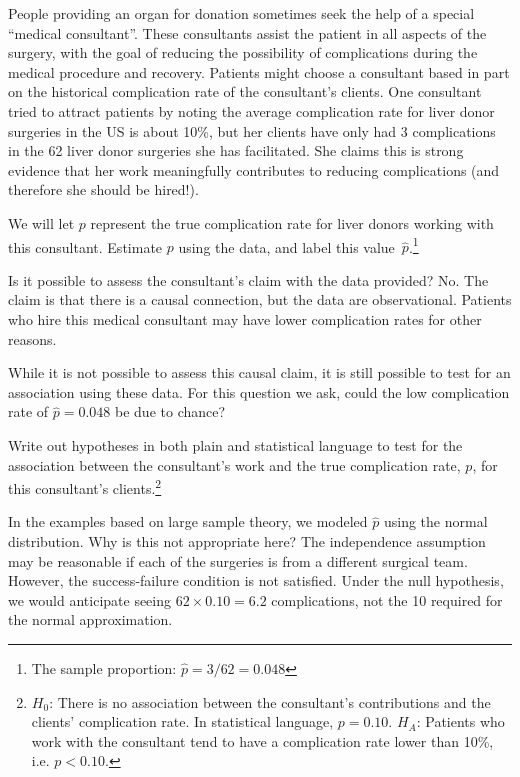 People providing an organ for donation sometimes seek the help of a special ``medical consultant''. These consultants assist the patient in all aspects of the surgery, with the goal of reducing the possibility of complications during the medical procedure and recovery. Patients might choose a consultant based in part on the historical complication rate of the consultant's clients. One consultant tried to attract patients by noting the average complication rate for liver donor surgeries in the US is about 10\%, but her clients have only had 3 complications in the 62 liver donor surgeries she has facilitated. She claims this is strong evidence that her work meaningfully contributes to reducing complications (and therefore she should be hired!).

\begin{exercise}
We will let $p$ represent the true complication rate for liver donors working with this consultant. Estimate $p$ using the data, and label this value~$\hat{p}$.\footnote{The sample proportion: $\hat{p} = 3/62 = 0.048$}
\end{exercise}

\begin{example}{Is it possible to assess the consultant's claim with the data provided?}
No. The claim is that there is a causal connection, but the data are observational. Patients who hire this medical consultant may have lower complication rates for other reasons.

While it is not possible to assess this causal claim, it is still possible to test for an association using these data. For this question we ask, could the low complication rate of $\hat{p} = 0.048$ be due to chance?
\end{example}

\begin{exercise} \label{hypForAssessingConsultantWorkInLiverTransplants}
Write out hypotheses in both plain and statistical language to test for the association between the consultant's work and the true complication rate, $p$, for this consultant's clients.\footnote{$H_0$: There is no association between the consultant's contributions and the clients' complication rate. In statistical language, $p=0.10$. $H_A$: Patients who work with the consultant tend to have a complication rate lower than 10\%, i.e. $p<0.10$.}
\end{exercise}

\begin{example}{In the examples based on large sample theory, we modeled $\hat{p}$ using the normal distribution. Why is this not appropriate here?}
The independence assumption may be reasonable if each of the surgeries is from a different surgical team. However, the success-failure condition is not satisfied. Under the null hypothesis, we would anticipate seeing $62\times 0.10=6.2$ complications, not the 10 required for the normal approximation.
\end{example}

